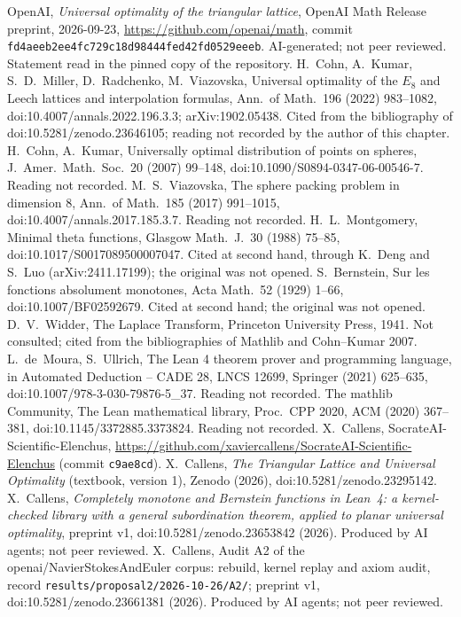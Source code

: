  OpenAI, \emph{Universal optimality of the triangular lattice}, OpenAI Math Release preprint, 2026-09-23, \url{https://github.com/openai/math}, commit \texttt{fd4aeeb2ee4fc729c18d98444fed42fd0529eeeb}. AI-generated; not peer reviewed. Statement read in the pinned copy of the repository.
 H.~Cohn, A.~Kumar, S.~D.~Miller, D.~Radchenko, M.~Viazovska, Universal optimality of the $E_8$ and Leech lattices and interpolation formulas, Ann.\ of Math.\ 196 (2022) 983--1082, doi:10.4007/annals.2022.196.3.3; arXiv:1902.05438. Cited from the bibliography of doi:10.5281/zenodo.23646105; reading not recorded by the author of this chapter.
 H.~Cohn, A.~Kumar, Universally optimal distribution of points on spheres, J.\ Amer.\ Math.\ Soc.\ 20 (2007) 99--148, doi:10.1090/S0894-0347-06-00546-7. Reading not recorded.
 M.~S.~Viazovska, The sphere packing problem in dimension 8, Ann.\ of Math.\ 185 (2017) 991--1015, doi:10.4007/annals.2017.185.3.7. Reading not recorded.
 H.~L.~Montgomery, Minimal theta functions, Glasgow Math.\ J.\ 30 (1988) 75--85, doi:10.1017/S0017089500007047. Cited at second hand, through K.~Deng and S.~Luo (arXiv:2411.17199); the original was not opened.
 S.~Bernstein, Sur les fonctions absolument monotones, Acta Math.\ 52 (1929) 1--66, doi:10.1007/BF02592679. Cited at second hand; the original was not opened.
 D.~V.~Widder, The Laplace Transform, Princeton University Press, 1941. Not consulted; cited from the bibliographies of Mathlib and Cohn--Kumar 2007.
 L.~de~Moura, S.~Ullrich, The Lean 4 theorem prover and programming language, in Automated Deduction -- CADE 28, LNCS 12699, Springer (2021) 625--635, doi:10.1007/978-3-030-79876-5\_37. Reading not recorded.
 The mathlib Community, The Lean mathematical library, Proc.\ CPP 2020, ACM (2020) 367--381, doi:10.1145/3372885.3373824. Reading not recorded.
 X.~Callens, SocrateAI-Scientific-Elenchus, \url{https://github.com/xaviercallens/SocrateAI-Scientific-Elenchus} (commit \texttt{c9ae8cd}).
 X.~Callens, \emph{The Triangular Lattice and Universal Optimality} (textbook, version 1), Zenodo (2026), doi:10.5281/zenodo.23295142.
 X.~Callens, \emph{Completely monotone and Bernstein functions in Lean~4: a kernel-checked library with a general subordination theorem, applied to planar universal optimality}, preprint v1, doi:10.5281/zenodo.23653842 (2026). Produced by AI agents; not peer reviewed.
 X.~Callens, Audit A2 of the openai/NavierStokesAndEuler corpus: rebuild, kernel replay and axiom audit, record \texttt{results/proposal2/2026-10-26/A2/}; preprint v1, doi:10.5281/zenodo.23661381 (2026). Produced by AI agents; not peer reviewed.
